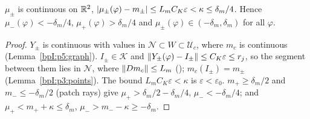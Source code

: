 \begin{lemma}\label{bpI:p5:mu}
$\mu_\pm$ is continuous on $\mathbb{R}^2$, $\lvert \mu_\pm(\varphi)-m_\pm\rvert\le L_mC_K\varepsilon<\kappa\le\delta_m/4$. Hence $\mu_-(\varphi)<-\delta_m/4$, $\mu_+(\varphi)>\delta_m/4$ and $\mu_\pm(\varphi)\in(-\delta_m,\delta_m)$ for all $\varphi$.
\end{lemma}
\begin{proof}
\label{stepI:p5:mu-cont} $Y_\pm$ is continuous with values in $\mathcal N\subset W\subset\mathcal U_c$, where $m_c$ is continuous (Lemma~\ref{bpI:p5:graph}).
\label{stepI:p5:mu-lip} $I_\pm\in\mathcal K$ and $\lVert Y_\pm(\varphi)-I_\pm\rVert\le C_K\varepsilon\le r_j$, so the segment between them lies in $\mathcal N$, where $\lVert Dm_c\rVert\le L_m$ (); $m_c(I_\pm)=m_\pm$ (Lemma~\ref{bpI:p3:points}). The bound $L_mC_K\varepsilon<\kappa$ is $\varepsilon<\varepsilon_0$.
\label{stepI:p5:mu-order} $m_+\ge\delta_m/2$ and $m_-\le-\delta_m/2$ (patch rays) give $\mu_+>\delta_m/2-\delta_m/4$, $\mu_-<-\delta_m/4$; and $\mu_+<m_++\kappa\le\delta_m$, $\mu_->m_--\kappa\ge-\delta_m$.
\end{proof}

